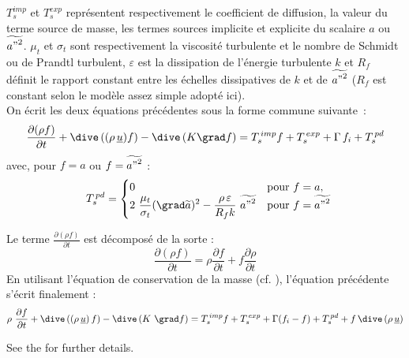 $T_s^{imp}$ et  $T_s^{exp}$ repr\'{e}sentent respectivement le coefficient de
diffusion, la valeur du terme source de masse, les termes sources implicite et
explicite du scalaire $a$ ou $\widetilde{{a"}^2}$. $\mu_t$ et $\sigma_t$
sont respectivement la viscosit\'{e} turbulente et le nombre de Schmidt ou de
Prandtl turbulent, $\varepsilon$ est la dissipation de l'\'{e}nergie turbulente $k$
et $R_f$ d\'{e}finit le rapport constant entre les \'{e}chelles dissipatives de $k$ et
de $\widetilde{{a"}^2}$ ($R_f$ est constant selon le mod\`{e}le assez simple adopt\'{e} ici).\\
On \'{e}crit les deux \'{e}quations pr\'{e}c\'{e}dentes sous la forme commune suivante~:
\begin{equation}
\frac {\partial  (\rho f)}{\partial t} + \dive\,((\rho\,\underline{u}) f)
- \dive\,(K \grad f) = T_s^{\,imp} f + T_s^{\,exp} + \Gamma\,f_i + T_s^{\,pd}
\end{equation}
avec, pour $f=a$ ou $f=\widetilde{{a"}^2}$ :\\
\begin{equation}
\begin{array}{lll}
&\displaystyle
T_s^{\,pd}=
\begin{cases}
0 & \text{pour $f=a$}, \\
2\ \displaystyle \frac{\mu_t}{\sigma_t}(\grad \widetilde{a})^2 -
\displaystyle \frac{\rho\,\varepsilon}{R_f k}\ \widetilde{{a"}^2} & \text{pour $f=\widetilde{{a"}^2}$ }
\end{cases}
\end{array}
\end{equation}

Le terme $\displaystyle \frac {\partial  (\rho f)}{\partial t}$ est d\'{e}compos\'{e} de la sorte :
\begin{equation}
\frac {\partial  (\rho f)}{\partial t}=\rho \frac {\partial f}{\partial t} + f
\frac {\partial \rho}{\partial t}
\end{equation}
En utilisant l'\'{e}quation de conservation de la masse (cf. ),
l'\'{e}quation pr\'{e}c\'{e}dente s'\'{e}crit finalement :\\
\begin{equation}\label{Base_Covofi_Eq_cv_scal}
\rho\ \displaystyle \frac {\partial f}{\partial t} +
\dive\,((\rho\,\underline{u})\,f) - \dive\,(K\ \grad f)
= T_s^{\,imp} f + T_s^{\,exp} + \Gamma (f_i - f) + T_s^{\,pd} + f\,\dive\,(\rho\,\underline{u})
\end{equation}

See the  for further details.

